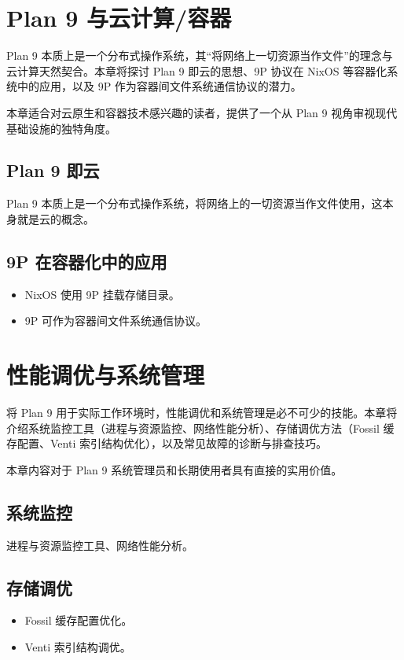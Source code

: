 \documentclass[12pt,UTF8]{ctexbook}
\begin{document}
\chapter{Plan 9 与云计算/容器}

Plan 9 本质上是一个分布式操作系统，其“将网络上一切资源当作文件”的理念与云计算天然契合。本章将探讨 Plan 9 即云的思想、9P 协议在 NixOS 等容器化系统中的应用，以及 9P 作为容器间文件系统通信协议的潜力。

本章适合对云原生和容器技术感兴趣的读者，提供了一个从 Plan 9 视角审视现代基础设施的独特角度。

\section{Plan 9 即云}
Plan 9 本质上是一个分布式操作系统，将网络上的一切资源当作文件使用，这本身就是云的概念。

\section{9P 在容器化中的应用}

\begin{itemize}
\item NixOS 使用 9P 挂载存储目录。
\item 9P 可作为容器间文件系统通信协议。
\end{itemize}

\chapter{性能调优与系统管理}

将 Plan 9 用于实际工作环境时，性能调优和系统管理是必不可少的技能。本章将介绍系统监控工具（进程与资源监控、网络性能分析）、存储调优方法（Fossil 缓存配置、Venti 索引结构优化），以及常见故障的诊断与排查技巧。

本章内容对于 Plan 9 系统管理员和长期使用者具有直接的实用价值。

\section{系统监控}

进程与资源监控工具、网络性能分析。

\section{存储调优}

\begin{itemize}
\item Fossil 缓存配置优化。
\item Venti 索引结构调优。
\end{itemize}
\end{document}
